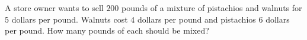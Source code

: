 A store owner wants to sell $200$ pounds of a mixture of pistachios and walnuts for $5$ dollars per pound. Walnuts cost $4$ dollars per pound and pistachios $6$ dollars per pound. How many pounds of each should be mixed?
